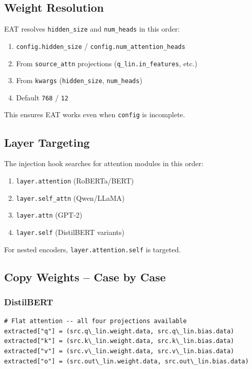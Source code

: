 \subsection{Weight Resolution}

EAT resolves \texttt{hidden\_size} and \texttt{num\_heads} in this order:

\begin{enumerate}
\item \texttt{config.hidden\_size} / \texttt{config.num\_attention\_heads}
\item From \texttt{source\_attn} projections (\texttt{q\_lin.in\_features}, etc.)
\item From \texttt{kwargs} (\texttt{hidden\_size}, \texttt{num\_heads})
\item Default \texttt{768} / \texttt{12}

\end{enumerate}
This ensures EAT works even when \texttt{config} is incomplete.

\subsection{Layer Targeting}

The injection hook searches for attention modules in this order:

\begin{enumerate}
\item \texttt{layer.attention} (RoBERTa/BERT)
\item \texttt{layer.self\_attn} (Qwen/LLaMA)
\item \texttt{layer.attn} (GPT-2)
\item \texttt{layer.self} (DistilBERT variants)

\end{enumerate}
For nested encoders, \texttt{layer.attention.self} is targeted.

\subsection{Copy Weights -- Case by Case}

\subsubsection{DistilBERT}

\begin{lstlisting}
# Flat attention -- all four projections available
extracted["q"] = (src.q\_lin.weight.data, src.q\_lin.bias.data)
extracted["k"] = (src.k\_lin.weight.data, src.k\_lin.bias.data)
extracted["v"] = (src.v\_lin.weight.data, src.v\_lin.bias.data)
extracted["o"] = (src.out\_lin.weight.data, src.out\_lin.bias.data)
\end{lstlisting}

